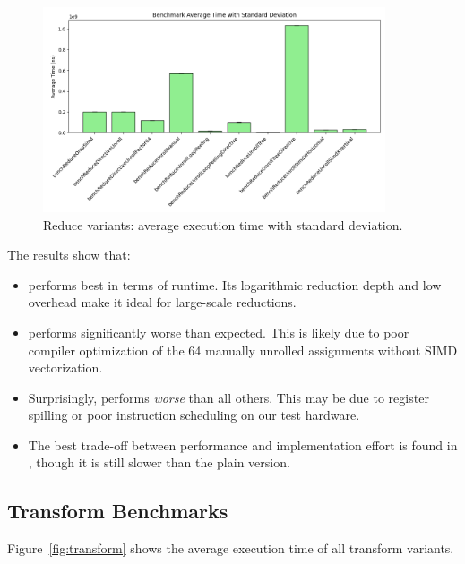 \begin{figure}[h]
    \centering
    \includegraphics[width=0.9\textwidth]{img/reduce_results.csv_ex02.png}
    \caption{Reduce variants: average execution time with standard deviation.}
    \label{fig:reduce}
\end{figure}

The results show that:
\begin{itemize}
    \item {} performs best in terms of runtime. Its logarithmic reduction depth and low overhead make it ideal for large-scale reductions.
    \item {} performs significantly worse than expected. This is likely due to poor compiler optimization of the 64 manually unrolled assignments without SIMD vectorization.
    \item Surprisingly,  performs \emph{worse} than all others. This may be due to register spilling or poor instruction scheduling on our test hardware.
    \item The best trade-off between performance and implementation effort is found in , though it is still slower than the plain  version.
\end{itemize}

\subsection*{Transform Benchmarks}

Figure~\ref{fig:transform} shows the average execution time of all transform variants.

